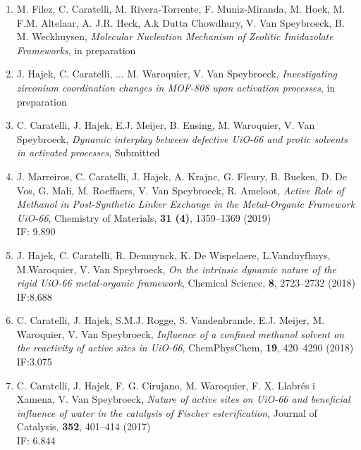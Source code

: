 \begin{enumerate}
\item
M. Filez, C. Caratelli, M. Rivera-Torrente, F. Muniz-Miranda, M. Hoek, M. F.M. Altelaar, A. J.R. Heck, A.k Dutta Chowdhury, V. Van Speybroeck, B. M. Weckhuysen, 
\textit{Molecular Nucleation Mechanism of Zeolitic Imidazolate Frameworks}, in preparation\\

\item
J. Hajek, C. Caratelli, ... M. Waroquier, V. Van Speybroeck, 
\textit{Investigating zirconium coordination changes in MOF-808 upon activation processes}, in preparation\\ 

\item
C. Caratelli, J. Hajek, E.J. Meijer, B. Ensing, M. Waroquier, V. Van Speybroeck, 
\textit{Dynamic interplay between defective UiO-66 and protic solvents in activated processes}, Submitted\\ 

\item
J. Marreiros, C. Caratelli, J. Hajek, A. Krajnc, G. Fleury, B. Bueken, D. De Vos, G. Mali, M. Roeffaers, V. Van Speybroeck, R. Ameloot, 
\textit{Active Role of Methanol in Post-Synthetic Linker Exchange in the Metal-Organic Framework UiO-66}, Chemistry of Materials, \textbf{31 (4)}, 1359--1369 (2019)\\ 
IF: 9.890

\item
J. Hajek, C. Caratelli, R. Demuynck, K. De Wispelaere, L.Vanduyfhuys, M.Waroquier, V. Van Speybroeck, 
\textit{On the intrinsic dynamic nature of the rigid UiO-66 metal-organic framework},  Chemical Science, \textbf{8}, 2723--2732 (2018)\\ IF:8.688

\item
C. Caratelli, J. Hajek, S.M.J. Rogge, S. Vandenbrande, E.J. Meijer, M. Waroquier, V. Van Speybroeck, 
\textit{Influence of a confined methanol solvent on the reactivity of active sites in UiO-66}, ChemPhysChem, \textbf{19}, 420--4290 (2018)\\ 
IF:3.075 

\item
C. Caratelli, J. Hajek, F. G. Cirujano, M. Waroquier, F. X. Llabr\'es i Xamena, V. Van Speybroeck, 
\textit{Nature of active sites on UiO-66 and beneficial influence of water in the catalysis of Fischer esterification},
Journal of Catalysis, \textbf{352}, 401--414 (2017) \\
IF: 6.844

\end{enumerate}


